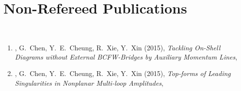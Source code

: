 \section*{\sc Non-Refereed Publications}~
\vspace{-.2in}

\begin{enumerate}

  \item 
  \baoyi,
  G.~Chen,
  Y.~E.~Cheung,           
  R.~Xie,
  Y.~Xin
  (2015),
  {\it Tackling On-Shell Diagrams without External BCFW-Bridges by Auxiliary Momentum Lines},
 
  \item 
  \baoyi,
  G.~Chen,
  Y.~E.~Cheung,           
  R.~Xie,
  Y.~Xin
  (2015),
  {\it Top-forms of Leading Singularities in Nonplanar Multi-loop Amplitudes},








 \end{enumerate}

